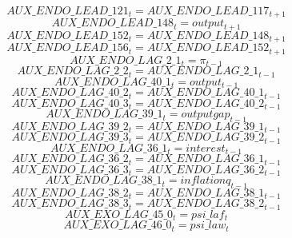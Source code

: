 \documentclass[10pt,a4paper]{article}
\begin{document}
\begin{dmath}
AUX\_ENDO\_LEAD\_121_{t}=AUX\_ENDO\_LEAD\_117_{t+1}
\end{dmath}
\begin{dmath}
AUX\_ENDO\_LEAD\_148_{t}=output_{t+1}
\end{dmath}
\begin{dmath}
AUX\_ENDO\_LEAD\_152_{t}=AUX\_ENDO\_LEAD\_148_{t+1}
\end{dmath}
\begin{dmath}
AUX\_ENDO\_LEAD\_156_{t}=AUX\_ENDO\_LEAD\_152_{t+1}
\end{dmath}
\begin{dmath}
AUX\_ENDO\_LAG\_2\_1_{t}=\pi_{t-1}
\end{dmath}
\begin{dmath}
AUX\_ENDO\_LAG\_2\_2_{t}=AUX\_ENDO\_LAG\_2\_1_{t-1}
\end{dmath}
\begin{dmath}
AUX\_ENDO\_LAG\_40\_1_{t}=output_{t-1}
\end{dmath}
\begin{dmath}
AUX\_ENDO\_LAG\_40\_2_{t}=AUX\_ENDO\_LAG\_40\_1_{t-1}
\end{dmath}
\begin{dmath}
AUX\_ENDO\_LAG\_40\_3_{t}=AUX\_ENDO\_LAG\_40\_2_{t-1}
\end{dmath}
\begin{dmath}
AUX\_ENDO\_LAG\_39\_1_{t}=outputgap_{t-1}
\end{dmath}
\begin{dmath}
AUX\_ENDO\_LAG\_39\_2_{t}=AUX\_ENDO\_LAG\_39\_1_{t-1}
\end{dmath}
\begin{dmath}
AUX\_ENDO\_LAG\_39\_3_{t}=AUX\_ENDO\_LAG\_39\_2_{t-1}
\end{dmath}
\begin{dmath}
AUX\_ENDO\_LAG\_36\_1_{t}=interest_{t-1}
\end{dmath}
\begin{dmath}
AUX\_ENDO\_LAG\_36\_2_{t}=AUX\_ENDO\_LAG\_36\_1_{t-1}
\end{dmath}
\begin{dmath}
AUX\_ENDO\_LAG\_36\_3_{t}=AUX\_ENDO\_LAG\_36\_2_{t-1}
\end{dmath}
\begin{dmath}
AUX\_ENDO\_LAG\_38\_1_{t}=inflationq_{t-1}
\end{dmath}
\begin{dmath}
AUX\_ENDO\_LAG\_38\_2_{t}=AUX\_ENDO\_LAG\_38\_1_{t-1}
\end{dmath}
\begin{dmath}
AUX\_ENDO\_LAG\_38\_3_{t}=AUX\_ENDO\_LAG\_38\_2_{t-1}
\end{dmath}
\begin{dmath}
AUX\_EXO\_LAG\_45\_0_{t}=psi\_laf_{t}
\end{dmath}
\begin{dmath}
AUX\_EXO\_LAG\_46\_0_{t}=psi\_law_{t}
\end{dmath}
\end{document}
